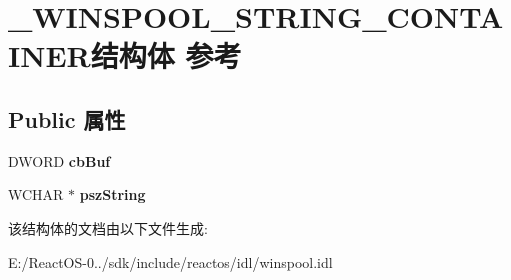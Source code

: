 \hypertarget{struct___w_i_n_s_p_o_o_l___s_t_r_i_n_g___c_o_n_t_a_i_n_e_r}{}\section{\+\_\+\+W\+I\+N\+S\+P\+O\+O\+L\+\_\+\+S\+T\+R\+I\+N\+G\+\_\+\+C\+O\+N\+T\+A\+I\+N\+E\+R结构体 参考}
\label{struct___w_i_n_s_p_o_o_l___s_t_r_i_n_g___c_o_n_t_a_i_n_e_r}
\subsection*{Public 属性}
\begin{DoxyCompactItemize}
\item 
\mbox{\label{struct___w_i_n_s_p_o_o_l___s_t_r_i_n_g___c_o_n_t_a_i_n_e_r_aa634eebd463c7e7e515145f34d1d5a5e}} 
D\+W\+O\+RD {\bfseries cb\+Buf}
\item 
\mbox{\label{struct___w_i_n_s_p_o_o_l___s_t_r_i_n_g___c_o_n_t_a_i_n_e_r_abeaf162658c9faa82433a906c143963e}} 
W\+C\+H\+AR $\ast$ {\bfseries psz\+String}
\end{DoxyCompactItemize}


该结构体的文档由以下文件生成\+:\begin{DoxyCompactItemize}
\item 
E\+:/\+React\+O\+S-\/0../sdk/include/reactos/idl/winspool.\+idl\end{DoxyCompactItemize}
